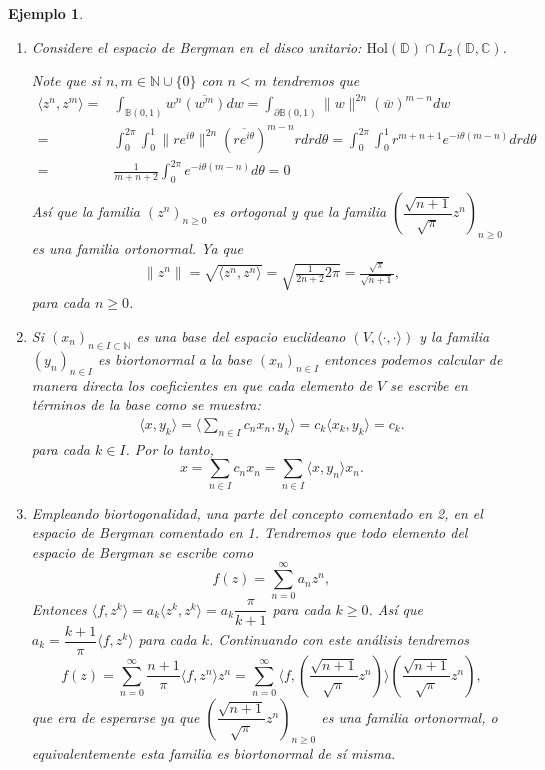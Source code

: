 \documentclass[twoside,12pt,a4 paper,openright]{book}
\newtheorem{ejem}[claim]{Ejemplo}
\begin{document}
\begin{ejem}  {} \ 
\begin{enumerate}
\item Considere el espacio de Bergman  en el disco unitario: $\textrm{Hol}(\mathbb D) \cap L_2(\mathbb D, \mathbb C)$.
  
Note que si $n,m\in \mathbb N\cup \{0\}$ con $n< m$  tendremos que 
\begin{align*}
 \langle z^n, z^m \rangle= & \int_{ \mathbb B(0,1)} w^n \overline{ (w^m)} dw=  \int_{\partial \mathbb B(0,1)}
  \|w\|^{2n} (\overline{w})^{m-n} dw \\
= &   \int_{0}^{2\pi} \int_{0}^1  
  \|r e^{i\theta   }\|^{2n} (\overline{r e^{i\theta   }})^{m-n} rdr d\theta   =  \int_{0}^{2\pi}    \int_{0}^1  
   r^{ m+ n +1 }   e^{- i\theta(m-n)   }   dr d\theta  \\
= & \frac{1  }{ m+ n +2  }  \int_{0}^{2\pi}    
     e^{- i\theta(m-n)   }    d\theta  =0 \\
\end{align*} 
As\'i que la familia $(z^n)_{n\geq 0}$ es ortogonal y que la familia $ ( \dfrac{  \sqrt{  n +1}   }{  \sqrt{\pi}  }    z^n )_{n\geq 0}  $ es una familia ortonormal.  Ya que  
\begin{align*}
\|z^n \| = \sqrt{  \langle z^n, z^n \rangle} =  \sqrt{ \frac{ 1 }{2n +2  }  2\pi} =  \frac{   \sqrt{\pi} }{  \sqrt{  n +1}  }  ,
\end{align*} 
 para cada $n\geq 0$.

\item     Si $(x_n)_{n\in  I \subset \mathbb N}$ es una base del espacio euclideano $(V, \langle \cdot,  \cdot\rangle)$
y la familia $(y_n)_{n\in  I}$ es biortonormal a la base $(x_n)_{n\in  I}$ entonces podemos calcular de manera directa los coeficientes en que cada elemento de $V$ se escribe en t\'erminos de la base como se muestra:
\begin{align*}
 \langle x, y_k \rangle=  \langle \sum_{n\in I} c_n x_n , y_k \rangle =  c_k \langle   x_k , y_k \rangle = c_k. 
\end{align*} 
para cada $k\in I$. Por lo tanto,  $$x= \sum_{n\in I} c_n x_n  =   \sum_{n\in I}  \langle x, y_n \rangle x_n   .$$

\item Empleando biortogonalidad,  una  parte del concepto comentado en 2, en el espacio de Bergman comentado en 1. Tendremos que todo elemento del espacio  de Bergman se escribe como 
$$f(z) = \sum_{n=0}^{\infty } a_n z^n ,$$
Entonces  $\langle f, z^k \rangle = a_k \langle z^k , z^k \rangle = a_k  \dfrac{ \pi }{ k +1  }   $ para cada $k \geq 0$. As\'i que $a_k = \dfrac{ k +1  }{ \pi }   \langle f, z^k \rangle  $ para cada $k$.  Continuando con este an\'alisis tendremos
$$f(z) = \sum_{n=0}^{\infty } \dfrac{ n +1  }{ \pi }   \langle f, z^n \rangle   z^n = \sum_{n=0}^{\infty }   \langle f,  
(\dfrac{ \sqrt{n +1}  }{\sqrt {\pi }   } z^n) \rangle   (\dfrac{ \sqrt{n +1}  }{\sqrt {\pi }   } z^n ),$$
que era de esperarse ya que $(\dfrac{ \sqrt{n +1}  }{\sqrt {\pi }   } z^n )_{n\geq 0}$ es una familia ortonormal, o equivalentemente esta familia es biortonormal de s\'i misma.
\end{enumerate}
\end{ejem}
\end{document}
